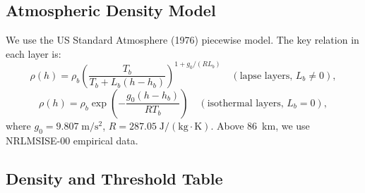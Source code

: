\documentclass[11pt,a4paper]{article}
\begin{document}
\subsection{Atmospheric Density Model}

We use the US Standard Atmosphere (1976) piecewise model. The key relation in each
layer is:
\begin{equation}
\rho(h) = \rho_b \left(\frac{T_b}{T_b + L_b(h - h_b)}\right)^{1 + g_0/(R L_b)}
\quad (\text{lapse layers, } L_b \neq 0),
\end{equation}
\begin{equation}
\rho(h) = \rho_b \exp\!\left(-\frac{g_0(h - h_b)}{R T_b}\right)
\quad (\text{isothermal layers, } L_b = 0),
\end{equation}
where $g_0 = 9.807\;\mathrm{m/s^2}$, $R = 287.05\;\mathrm{J/(kg\cdot K)}$.
Above 86~km, we use NRLMSISE-00 empirical data.

\subsection{Density and Threshold Table}
\end{document}
